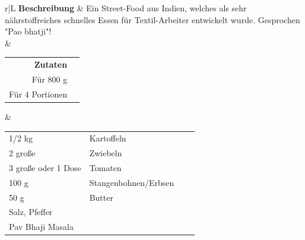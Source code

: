 \documentclass[a4paper, 12pt]{scrbook} 								%
\numberwithin{equation}{section} 									%
\begin{document}
			\begin{tabularx}{\textwidth}{r|L}
				\textbf{Beschreibung}	&	Ein Street-Food aus Indien, welches als sehr nährstoffreiches schnelles Essen für Textil-Arbeiter entwickelt wurde. Gesprochen "Pao bhatji"!\\
										&	\\
				\begin{tabular}[t]{rr}
					\textbf{Zutaten}	\\
					Für 800 g 			\\
					Für 4 Portionen	\\
				\end{tabular}			&	\begin{tabular}[t]{llll}
												1/2 kg & Kartoffeln \\
												2 große & Zwiebeln \\
												3 große oder 1 Dose & Tomaten \\
												100 g & Stangenbohnen/Erbsen \\
												50 g & Butter \\ 
												Salz, Pfeffer \\
												Pav Bhaji Masala \\


\end{tabular}
\end{tabularx}
\end{document}
